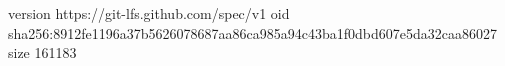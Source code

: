 version https://git-lfs.github.com/spec/v1
oid sha256:8912fe1196a37b5626078687aa86ca985a94c43ba1f0dbd607e5da32caa86027
size 161183
